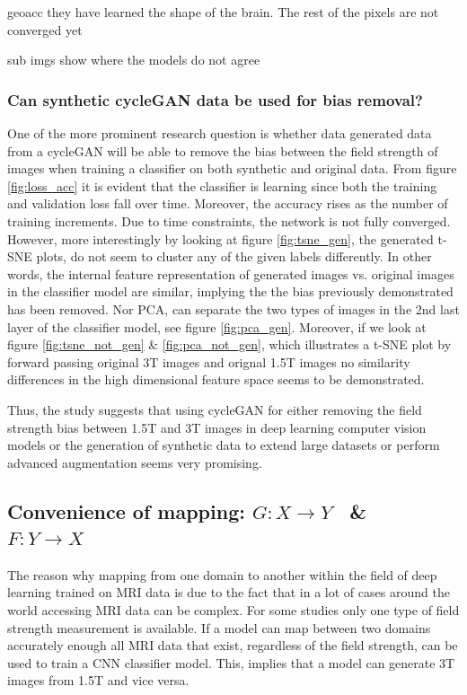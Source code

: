 \documentclass[12pt, fleqn, titlepage]{article}
\newcommand{\1}[1]{\mathds{1}\left[#1\right]}
\begin{document}
geoacc
they have learned the shape of the brain. The rest of the pixels are not converged yet

sub imgs
show where the models do not agree


\subsubsection{Can synthetic cycleGAN data be used for bias removal?}
One of the more prominent research question is whether data generated data from a cycleGAN will be able to remove the bias between the field strength of images when training a classifier on both synthetic and original data. From figure \ref{fig:loss_acc} it is evident that the classifier is learning since both the training and validation loss fall over time. Moreover, the accuracy rises as the number of training increments. Due to time constraints, the network is not fully converged. However, more interestingly by looking at figure \ref{fig:tsne_gen}, the generated t-SNE plots, do not seem to cluster any of the given labels differently. In other words, the internal feature representation of generated images vs. original images in the classifier model are similar, implying the the bias previously demonstrated has been removed. Nor PCA, can separate the two types of images in the 2nd last layer of the classifier model, see figure \ref{fig:pca_gen}. Moreover, if we look at figure \ref{fig:tsne_not_gen} \& \ref{fig:pca_not_gen}, which illustrates a t-SNE plot by forward passing original 3T images and orignal 1.5T images no similarity differences in the high dimensional feature space seems to be demonstrated.

Thus, the study suggests that using cycleGAN for either removing the field strength bias between 1.5T and 3T images in deep learning computer vision models or the generation of synthetic data to extend large datasets or perform advanced augmentation seems very promising. 


\subsection{Convenience of mapping: $ G: X \rightarrow Y $ \ \& \ $ F: Y \rightarrow X $ }

The reason why mapping from one domain to another within the field of deep learning trained on MRI data is due to the fact that in a lot of cases around the world accessing MRI data can be complex. For some studies only one type of field strength measurement is available. If a model can map between two domains accurately enough all MRI data that exist, regardless of the field strength, can be used to train a CNN classifier model. This, implies that a model can generate 3T images from 1.5T and vice versa. 
\end{document}
